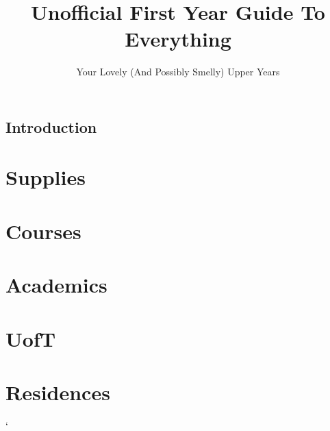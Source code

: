 \documentclass[12pt]{report}
\author{Your Lovely (And Possibly Smelly) Upper Years}
\title{Unofficial First Year Guide To Everything}
\begin{document}
\maketitle
\tableofcontents

\section{Introduction}

\chapter{Supplies}


\chapter{Courses}


\chapter{Academics}


\chapter{UofT}


\chapter{Residences}`

\end{document}
